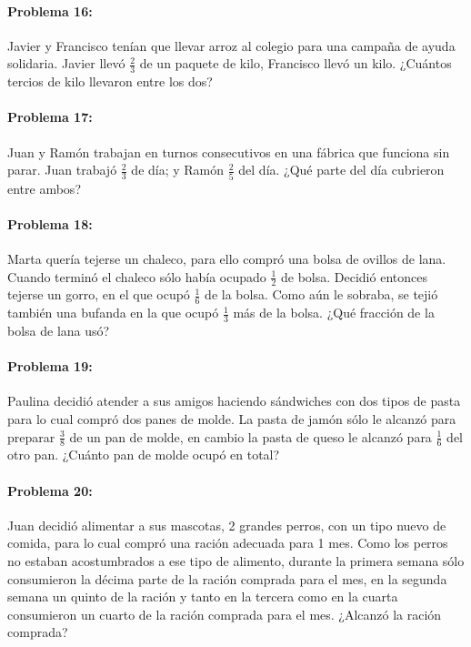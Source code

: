 \documentclass[10pt,twoside]{article}
\begin{document}
\paragraph*{Problema 16:} Javier y Francisco tenían que llevar arroz al colegio para una campaña de ayuda solidaria. Javier llevó $\frac{2}{3}$ de un paquete de kilo, Francisco llevó un kilo. ¿Cuántos tercios de kilo llevaron entre los dos?
\paragraph*{Problema 17:} Juan y Ramón trabajan en turnos consecutivos en una fábrica que funciona sin parar. Juan trabajó $\frac{2}{3}$ de día; y Ramón $\frac{2}{5}$ del día. ¿Qué parte del día cubrieron entre ambos?
\paragraph*{Problema 18:} Marta quería tejerse un chaleco, para ello compró una bolsa de ovillos de lana. Cuando terminó el chaleco sólo había ocupado $\frac{1}{2}$ de bolsa. Decidió entonces tejerse un gorro, en el que ocupó $\frac{1}{6}$ de la bolsa. Como aún le sobraba, se tejió también una bufanda en la que ocupó $\frac{1}{3}$ más de la bolsa. ¿Qué
fracción de la bolsa de lana usó?
\paragraph*{Problema 19:} Paulina decidió atender a sus amigos haciendo sándwiches con dos tipos de pasta para lo cual compró dos panes de molde. La pasta de jamón sólo le alcanzó para preparar $\frac{3}{8}$ de un pan de molde, en cambio la pasta de queso le alcanzó para $\frac{1}{6}$ del otro pan. ¿Cuánto pan de molde ocupó en total?
\paragraph*{Problema 20:} Juan decidió alimentar a sus mascotas, 2 grandes perros, con un tipo nuevo de comida, para lo cual compró una ración adecuada para 1 mes. Como los perros no estaban acostumbrados a ese tipo de alimento, durante la primera semana sólo
consumieron la décima parte de la ración comprada
para el mes, en la segunda semana un quinto de la
ración y tanto en la tercera como en la cuarta
consumieron un cuarto de la ración comprada para
el mes. ¿Alcanzó la ración comprada?
\end{document}
